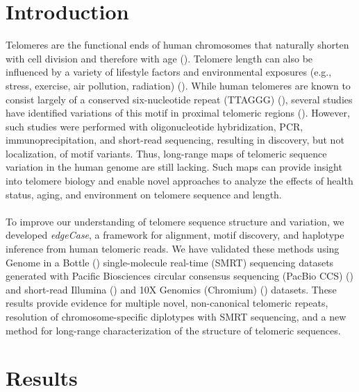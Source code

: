 \documentclass{article}
\newcommand{\citep}[1]{(\cite{#1})}
\begin{document}
\section*{Introduction} 
Telomeres are the functional ends of human chromosomes that naturally shorten with cell division and therefore with age \citep{teloaging}.
Telomere length can also be influenced by a variety of lifestyle factors and environmental exposures (e.g., stress, exercise, air pollution, radiation) \citep{teloeffects}.
While human telomeres are known to consist largely of a conserved six-nucleotide repeat (TTAGGG) \citep{moyzis}, several studies have identified variations of this motif in proximal telomeric regions \citep{telovars1989,telovars1999,telovars2018,telovars2019}.
However, such studies were performed with oligonucleotide hybridization, PCR, immunoprecipitation, and short-read sequencing, resulting in discovery, but not localization, of motif variants.
Thus, long-range maps of telomeric sequence variation in the human genome are still lacking.
Such maps can provide insight into telomere biology and enable novel approaches to analyze the effects of health status, aging, and environment on telomere sequence and length.
\\~\\
To improve our understanding of telomere sequence structure and variation, we developed \textit{edgeCase}, a framework for alignment, motif discovery, and haplotype inference from human telomeric reads.
We have validated these methods using Genome in a Bottle \citep{giab} single-molecule real-time (SMRT) sequencing datasets generated with Pacific Biosciences circular consensus sequencing (PacBio CCS) \citep{pacbio,pacbioccs} and short-read Illumina \citep{illumina} and 10X Genomics (Chromium) \citep{10x} datasets.
These results provide evidence for multiple novel, non-canonical telomeric repeats, resolution of chromosome-specific diplotypes with SMRT sequencing, and a new method for long-range characterization of the structure of telomeric sequences.

\section*{Results} 
\end{document}
